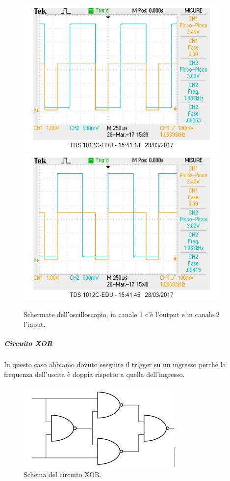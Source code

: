 \documentclass[10pt,a4paper]{article}
\begin{document}
\begin{figure}[!htb]
  \centering
  \includegraphics[scale=0.75]{or1.png}\includegraphics[scale=0.75]{or2.png}
\caption{Schermate dell'oscilloscopio, in canale 1 c'è l'output e in canale 2 l'input.\label{osc:OR}}
\end{figure}

\subparagraph{Circuito XOR}
In questo caso abbiamo dovuto eseguire il trigger su un ingresso perchè la frequenza dell'uscita è doppia rispetto a quella dell'ingresso.


\begin{figure}[!htb]
  \centering
  \includegraphics[scale=0.5]{XOR.png}
\caption{Schema del circuito XOR.\label{fig:XOR}}
\end{figure}
\end{document}
